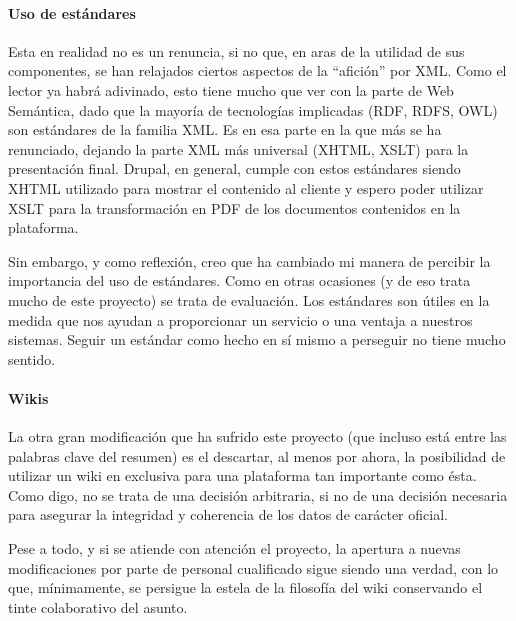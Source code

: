 \paragraph{Uso de estándares}
\par Esta en realidad no es un renuncia, si no que, en aras de la utilidad de sus componentes, se han relajados ciertos aspectos de la ``afición'' por XML. Como el lector ya habrá adivinado, esto tiene mucho que ver con la parte de Web Semántica, dado que la mayoría de tecnologías implicadas (RDF, RDFS, OWL) son estándares de la familia XML. Es en esa parte en la que más se ha renunciado, dejando la parte XML más universal (XHTML, XSLT) para la presentación final. Drupal, en general, cumple con estos estándares siendo XHTML utilizado para mostrar el contenido al cliente y espero poder utilizar XSLT para la transformación en PDF de los documentos contenidos en la plataforma.
\par Sin embargo, y como reflexión, creo que ha cambiado mi manera de percibir la importancia del uso de estándares. Como en otras ocasiones (y de eso trata mucho de este proyecto) se trata de evaluación. Los estándares son útiles en la medida que nos ayudan a proporcionar un servicio o una ventaja a nuestros sistemas. Seguir un estándar como hecho en sí mismo a perseguir no tiene mucho sentido.

\paragraph{Wikis}
\par La otra gran modificación que ha sufrido este proyecto (que incluso está entre las palabras clave del resumen) es el descartar, al menos por ahora, la posibilidad de utilizar un wiki en exclusiva para una plataforma tan importante como ésta. Como digo, no se trata de una decisión arbitraria, si no de una decisión necesaria para asegurar la integridad y coherencia de los datos de carácter oficial.
\par Pese a todo, y si se atiende con atención el proyecto, la apertura a nuevas modificaciones por parte de personal cualificado sigue siendo una verdad, con lo que, mínimamente, se persigue la estela de la filosofía del wiki conservando el tinte colaborativo del asunto.

